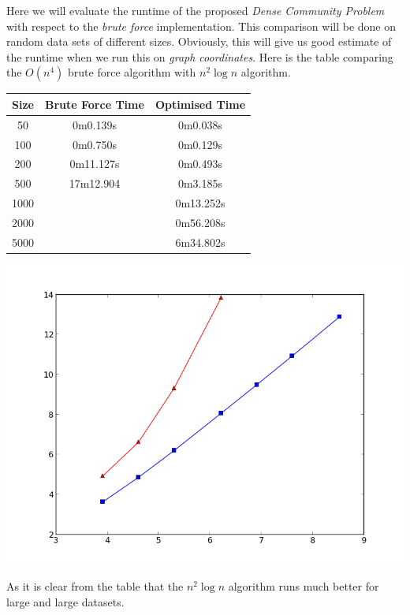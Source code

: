 \documentclass{article}
\begin{document}
            Here we will evaluate the runtime of the proposed {\em Dense Community Problem} with respect to the {\em brute force} implementation. This comparison will be done on random data sets of different sizes. Obviously, this will give us good estimate of the runtime when we run this on {\em graph coordinates}. Here is the table comparing the $O(n^4)$ brute force algorithm with $n^2 \log n$ algorithm.
            \begin{center}
            \begin{tabular}{| c | c | c |}
                \hline
                Size & Brute Force Time & Optimised Time \\
                \hline
                50 & 0m0.139s & 0m0.038s \\
                \hline
                100 & 0m0.750s & 0m0.129s \\
                \hline
                200 & 0m11.127s & 0m0.493s \\
                \hline
                500 & 17m12.904 & 0m3.185s \\
                \hline
                1000 & & 0m13.252s \\
                \hline
                2000 & & 0m56.208s \\
                \hline
                5000 & & 6m34.802s \\
                \hline
            \end{tabular}
            
            \includegraphics[scale=0.8]{runtime.png}
            \end{center}
            As it is clear from the  table that the $n^2 \log n$ algorithm runs much better for large and large datasets.
        
\end{document}
